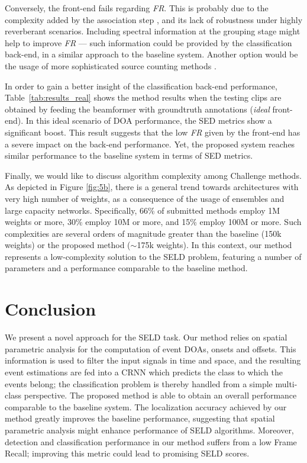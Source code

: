 Conversely, the front-end fails regarding \textit{FR}. This is probably due to the complexity added by the association step \cite{Adavanne2018_JSTSP}, and its lack of robustness under highly reverberant scenarios. Including spectral information at the grouping stage might help to improve \textit{FR} --- such information could be provided by the classification back-end, in a similar approach to the baseline system. Another option would be the usage of more sophisticated source counting methods \cite{he2010detecting, Stefanakis2017}.

In order to gain a better insight of the classification back-end performance, Table~\ref{tab:results_real} shows the method results when the testing clips are obtained by feeding  the beamformer  with groundtruth annotations (\textit{ideal} front-end).
In this ideal scenario of DOA performance, the SED metrics show a significant boost. 
This result suggests that the low \textit{FR} given by the front-end has a severe impact on the back-end  performance.
Yet, the proposed system reaches similar performance to the baseline system in terms of SED metrics.

Finally, we would like to discuss algorithm complexity among Challenge methods. 
As depicted in Figure \ref{fig:5b}, there is a general trend towards architectures with very high number of weights, as a consequence of the usage of ensembles and large capacity networks.
Specifically, 66\% of submitted methods employ 1M weights or more, 30\% employ 10M or more, and 15\% employ 100M or more. Such complexities are several orders of magnitude greater than the baseline (150k weights) or the proposed method ($\sim$175k weights).
In this context, our method represents a low-complexity solution to the SELD problem, featuring a number of parameters and a performance comparable to the baseline method.


\section{Conclusion}
\label{sec:conclusion}

We present a novel approach for the SELD task. Our method relies on spatial parametric analysis for the computation of event DOAs, onsets and offsets. This information is used to filter the input signals in time and space, and the resulting event estimations are fed into a CRNN which predicts the class to which the events belong; the classification problem is thereby handled from a simple multi-class perspective.
The proposed method is able to obtain an overall performance comparable to the baseline system. 
The localization accuracy achieved by our method greatly improves the baseline performance, suggesting that spatial parametric analysis might enhance performance of SELD algorithms. Moreover, detection and classification performance in our method suffers from a low Frame Recall; improving this metric could lead to promising SELD scores.



